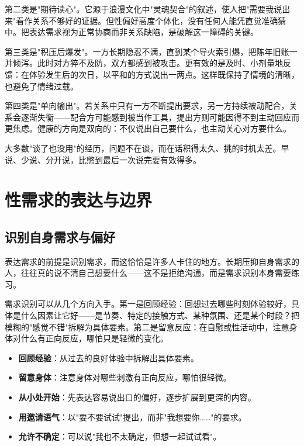 \documentclass[12pt,UTF8]{ctexbook}
\newcommand{\keyword}[1]{\textbf{#1}}
\begin{document}
第二类是"期待读心"。它源于浪漫文化中"灵魂契合"的叙述，使人把"需要我说出来"看作关系不够好的证据。但性偏好高度个体化，没有任何人能凭直觉准确猜中。把表达需求视为正常协商而非关系缺陷，是破解这一障碍的关键。

第三类是"积压后爆发"。一方长期隐忍不满，直到某个导火索引爆，把陈年旧账一并倾泻。此时对方猝不及防，双方都感到被攻击。更有效的是及时、小剂量地反馈：在体验发生后的次日，以平和的方式说出一两点。这样既保持了情境的清晰，也避免了情绪过载。

第四类是"单向输出"。若关系中只有一方不断提出要求，另一方持续被动配合，关系会逐渐失衡——配合方可能感到被当作工具，提出方则可能因得不到主动回应而更焦虑。健康的方向是双向的：不仅说出自己要什么，也主动关心对方要什么。

\begin{tcolorbox}[colback=pink!5!white,colframe=red!50!black,title=贴心小叮咛]
大多数"谈了也没用"的经历，问题不在谈，而在话积得太久、挑的时机太差。早说、少说、分开说，比憋到最后一次说完要有效得多。
\end{tcolorbox}

\section{性需求的表达与边界}
\subsection{识别自身需求与偏好}

表达需求的前提是识别需求，而这恰恰是许多人卡住的地方。长期压抑自身需求的人，往往真的说不清自己想要什么——这不是拒绝沟通，而是需求识别本身需要练习。

需求识别可以从几个方向入手。第一是回顾经验：回想过去哪些时刻体验较好，具体是什么因素让它好——是节奏、特定的接触方式、某种氛围、还是某个时段？把模糊的"感觉不错"拆解为具体要素。第二是留意反应：在自慰或性活动中，注意身体对什么有正向反应，哪怕只是轻微的变化。

\begin{itemize}
  \item \keyword{回顾经验}：从过去的良好体验中拆解出具体要素。
  \item \keyword{留意身体}：注意身体对哪些刺激有正向反应，哪怕很轻微。
  \item \keyword{从小处开始}：先表达容易说出口的偏好，逐步扩展到更深的内容。
  \item \keyword{用邀请语气}：以"要不要试试"提出，而非"我想要你……"的要求。
  \item \keyword{允许不确定}：可以说"我也不太确定，但想一起试试看"。
\end{itemize}
\end{document}
